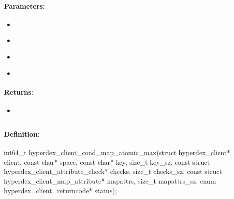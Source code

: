 \paragraph{Parameters:}
\begin{itemize}[noitemsep]
\item {}\\

\item {}\\

\item {}\\

\item {}\\

\end{itemize}

\paragraph{Returns:}
\begin{itemize}[noitemsep]
\item {}\\

\end{itemize}

\pagebreak
\subsection{}
\label{api:c:cond_map_atomic_max}


\paragraph{Definition:}
\begin{ccode}
int64_t hyperdex_client_cond_map_atomic_max(struct hyperdex_client* client,
        const char* space,
        const char* key, size_t key_sz,
        const struct hyperdex_client_attribute_check* checks, size_t checks_sz,
        const struct hyperdex_client_map_attribute* mapattrs, size_t mapattrs_sz,
        enum hyperdex_client_returncode* status);
\end{ccode}


